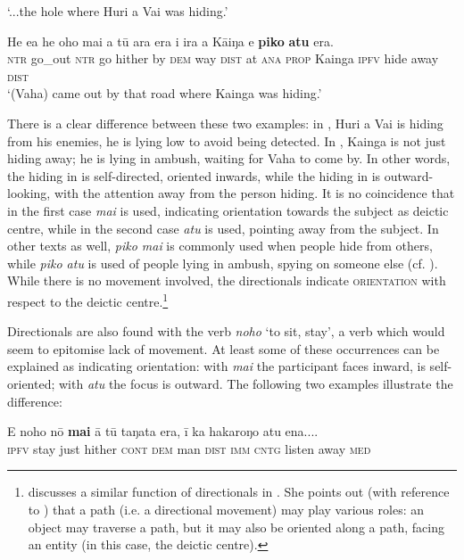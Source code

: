 \glt 
‘...the hole where Huri a Vai was hiding.’ \textstyleExampleref{[R304.044]} 
\z

\ea\label{ex:7.144}
\gll He e{\ꞌ}a he oho mai a tū ara era {\ꞌ}i ira a Kāiŋa e \textbf{piko} \textbf{atu} era. \\
\textsc{ntr} go\_out \textsc{ntr} go hither by \textsc{dem} way \textsc{dist} at \textsc{ana} \textsc{prop} Kainga \textsc{ipfv} hide away \textsc{dist} \\

\glt
‘(Vaha) came out by that road where Kainga was hiding.’ \textstyleExampleref{[R304.094]} 
\z

There is a clear difference between these two examples: in , Huri a Vai is hiding from his enemies, he is lying low to avoid being detected. In , Kainga is not just hiding away; he is lying in ambush, waiting for Vaha to come by. In other words, the hiding in  is self-directed, oriented inwards, while the hiding in  is outward-looking, with the attention away from the person hiding. It is no coincidence that in the first case \textit{mai} is used, indicating orientation towards the subject as deictic centre, while in the second case \textit{atu} is used, pointing away from the subject. In other texts as well, \textit{piko mai} is commonly used when people hide from others, while \textit{piko atu} is used of people lying in ambush, spying on someone else (cf. \citealt[12]{Fuller1980}). While there is no movement involved, the directionals indicate \textsc{orientation} with respect to the deictic centre.\footnote{\label{fn:357}\citet[1751]{Hooper2004} discusses a similar function of directionals in . She points out (with reference to \citealt{Jackendoff1983}) that a path (i.e. a directional movement) may play various roles: an object may traverse a path, but it may also be oriented along a path, facing an entity (in this case, the deictic centre).} 

Directionals are also found with the verb \textit{noho} ‘to sit, stay’, a verb which would seem to epitomise lack of movement. At least some of these occurrences can be explained as indicating orientation: with \textit{mai} the participant faces inward, is self-oriented; with \textit{atu} the focus is outward. The following two examples illustrate the difference:

\ea\label{ex:7.145}
\gll E noho nō \textbf{mai} {\ꞌ}ā tū taŋata era, {\ꞌ}ī ka hakaroŋo atu ena....\\
\textsc{ipfv} stay just hither \textsc{cont} \textsc{dem} man \textsc{dist} \textsc{imm} \textsc{cntg} listen away \textsc{med}\\

